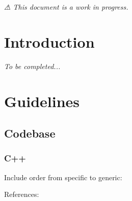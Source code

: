 {\itshape ⚠ This document is a work in progress.}\hypertarget{md__c_o_n_t_r_i_b_u_t_i_n_g_Introduction}{}\section{Introduction}\label{md__c_o_n_t_r_i_b_u_t_i_n_g_Introduction}
{\itshape To be completed...}\hypertarget{md__c_o_n_t_r_i_b_u_t_i_n_g_Guidelines}{}\section{Guidelines}\label{md__c_o_n_t_r_i_b_u_t_i_n_g_Guidelines}
\hypertarget{md__c_o_n_t_r_i_b_u_t_i_n_g_Codebase}{}\subsection{Codebase}\label{md__c_o_n_t_r_i_b_u_t_i_n_g_Codebase}
\hypertarget{md__c_o_n_t_r_i_b_u_t_i_n_g_C}{}\subsubsection{C++}\label{md__c_o_n_t_r_i_b_u_t_i_n_g_C}
Include order from specific to generic\+:


\begin{DoxyCode}{0}
\DoxyCodeLine{\textcolor{preprocessor}{\#include <Library/Astrodynamics/Orbit.hpp>}}
\DoxyCodeLine{}
\DoxyCodeLine{}
\DoxyCodeLine{\textcolor{preprocessor}{\#include <map>}}
\DoxyCodeLine{\textcolor{preprocessor}{\#include <string>}}
\end{DoxyCode}


References\+:


